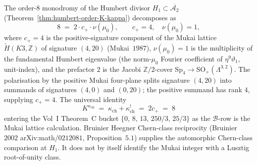 \begin{remark}[Humbert $H_1$ order $8 = 2 \cdot c_+ \cdot \nu(\mu_0)$ with $c_+ = 4$ from Mukai $(4, 20)$]
\label{rem:k3-chiral-bialgebra-H1-order-8-mukai}
The order-$8$ monodromy of the Humbert divisor $H_1 \subset \overline{\mathcal{A}_2}$ (Theorem~\ref{thm:humbert-order-K-kappa}) decomposes as
\[
 8 \;=\; 2 \cdot c_+ \cdot \nu(\mu_0), \qquad c_+ = 4, \quad \nu(\mu_0) = 1,
\]
where $c_+ = 4$ is the positive-signature component of the Mukai lattice $\widetilde H(K3, \mathbb{Z})$ of signature $(4, 20)$ (Mukai~$1987$), $\nu(\mu_0) = 1$ is the multiplicity of the fundamental Humbert eigenvalue (the norm-$\mu_0$ Fourier coefficient of $\eta^9 \vartheta_1$, unit-index), and the prefactor $2$ is the Jacobi $\mathbb{Z}/2$-cover $\mathrm{Sp}_4 \to \mathrm{SO}_+(\Lambda^{3, 2})$. The polarisation by the positive Mukai four-plane splits signature $(4, 20)$ into summands of signatures $(4, 0)$ and $(0, 20)$; the positive summand has rank $4$, supplying $c_+ = 4$. The universal identity
\[
 K^{\kappa_{\mathrm{ch}}} \;=\; \kappa_{\mathrm{ch}} + \kappa_{\mathrm{ch}}^! \;=\; 2 c_+ \;=\; 8
\]
entering the Vol~I Theorem~C bucket $\{0,\, 8,\, 13,\, 250/3,\, 25/3\}$ as the $\mathcal{B}$-row is the Mukai lattice calculation. Bruinier Heegner Chern-class reciprocity (Bruinier~$2002$ arXiv:math/$0212081$, Proposition~$5.1$) supplies the automorphic Chern-class comparison at \(H_1\). It does not by itself identify the Mukai integer with a Lusztig root-of-unity class.
\end{remark}

